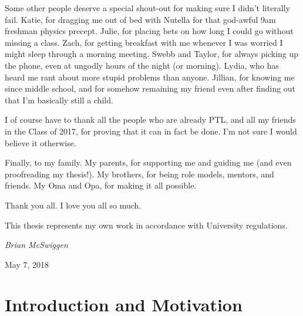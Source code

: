 \documentclass[12pt]{article}
\begin{document}
\begin{singlespace}
Some other people deserve a special shout-out for making sure I didn’t literally fail. Katie, for dragging me out of bed with Nutella for that god-awful 9am freshman physics precept. Julie, for placing bets on how long I could go without missing a class. Zach, for getting breakfast with me whenever I was worried I might sleep through a morning meeting. Swebb and Taylor, for always picking up the phone, even at ungodly hours of the night (or morning). Lydia, who has heard me rant about more stupid problems than anyone. Jillian, for knowing me since middle school, and for somehow remaining my friend even after finding out that I’m basically still a child.

I of course have to thank all the people who are already PTL, and all my friends in the Class of 2017, for proving that it can in fact be done. I’m not sure I would believe it otherwise.

Finally, to my family. My parents, for supporting me and guiding me (and even proofreading my thesis!). My brothers, for being role models, mentors, and friends. My Oma and Opa, for making it all possible.

Thank you all. I love you all so much.
\setlength{\parskip}{1em}
\end{singlespace}

\clearpage

\begin{singlespace}
\vspace*{1.5in}
\begin{center}
    This thesis represents my own work in accordance with University regulations.
\end{center}
\begin{flushright}
    \textit{Brian McSwiggen}
    
    May 7, 2018
\end{flushright}
\end{singlespace}

\clearpage

\begin{singlespace}
\setlength{\parskip}{-0.1em}
\tableofcontents
\setlength{\parskip}{1em}
\end{singlespace}

\clearpage
{}

\section{Introduction and Motivation}
\end{document}
